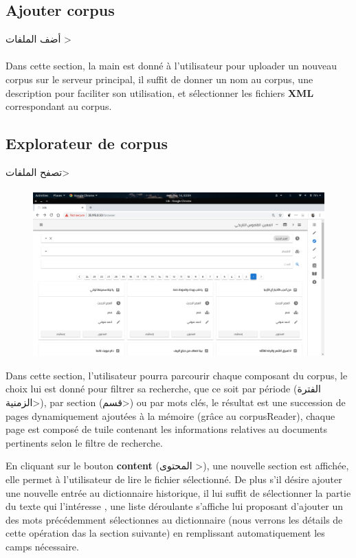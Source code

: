 \documentclass[]{report}
\begin{document}
		\subsection{Ajouter corpus}
		\Large{\< أضف الملفات >}
			\paragraph{}
			Dans cette section, la main est donné à l'utilisateur pour uploader un nouveau corpus sur le serveur principal,  il suffit de donner un nom au corpus, une description pour faciliter son utilisation, et sélectionner les fichiers \textbf{XML} correspondant au corpus.
			
		\subsection{Explorateur de corpus }
		\Large{\<تصفح الملفات> }
			\paragraph{}
			\begin{figure}[H]
				\centering
				\includegraphics[width=0.8\linewidth]{images/app/corpusbrowser.png}
			\end{figure}
			Dans cette section, l'utilisateur pourra parcourir chaque composant du corpus, le choix lui est donné pour filtrer 
			sa recherche, que ce soit par période (\<الفترة الزمنية>), par section (\<قسم>) ou par mots clés, le résultat est une succession de pages dynamiquement ajoutées à la mémoire (grâce au corpusReader), chaque page est composé de tuile contenant les informations relatives au documents pertinents selon le filtre de recherche.
			\par
			En cliquant sur le bouton \textbf{content} (\<المحتوى >), une nouvelle section est affichée, elle permet à l'utilisateur 
			de lire le fichier sélectionné. De plus s'il désire ajouter une nouvelle entrée au dictionnaire historique, il lui suffit de sélectionner la partie du texte qui l'intéresse , une liste déroulante s'affiche lui proposant d'ajouter un des mots précédemment sélectionnes au dictionnaire (nous verrons les détails de cette opération das la section suivante) en remplissant automatiquement les camps nécessaire.
\end{document}
